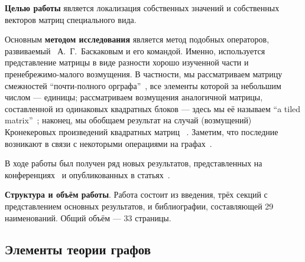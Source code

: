 \documentclass[14pt,a4paper]{extarticle}
\theoremstyle{definition}
\begin{document}
\textbf{Целью работы}
является локализация собственных значений и собственных векторов
матриц специального вида.

Основным \textbf{методом исследования} является ме\-тод подобных опер\-атор\-ов,
развиваемый~\cite{baskakov1986theorem,baskakov1987theorem,baskakov1994spectral,baskakov2002splitting}
А.~Г.~Баскаковым и его командой. Именно, используется представление матрицы
в виде разности хорошо изученной части и пренебрежимо-малого возмущения.
В частности, мы рас\-сматр\-иваем матрицу смежностей
``почти-полного орграфа''~\cite{Koz17,sergekozlukov@vspu},
все элементы которой за небольшим числом --- единицы;
рассматриваем возмущения аналогичной матрицы, составленной из одинаковых
квадрат\-ных блоков --- здесь мы её называем ``a tiled
matrix''~\cite{Koz18,sergekozlukov@currentproblems};
наконец, мы обобщ\-аем результат на случай (возмущений) Кронекер\-овых
произведений квадратных матриц
~\cite{Koz18,sergekozlukov@currentproblems,bellman-matrices-kron,XIANG2005210}.
Заметим, что последние возникают в связи с некоторыми операциями на графах~\cite{cvetkovic1997eigenspaces}.

В ходе работы был получен ряд новых результатов, представленных на
конференциях~\cite{sergekozlukov@vspu,sergekozlukov@currentproblems} и
опубликованных в статьях~\cite{Koz17,Koz18}.

\textbf{Структура и объём работы}. Работа состоит из введения, трёх секций с
представлением основных результатов, и би\-блио\-графии, со\-став\-ляющей 29
на\-имено\-ва\-ний. Общий объём --- 33 страницы.


\subsection{Элементы теории графов}
\end{document}
